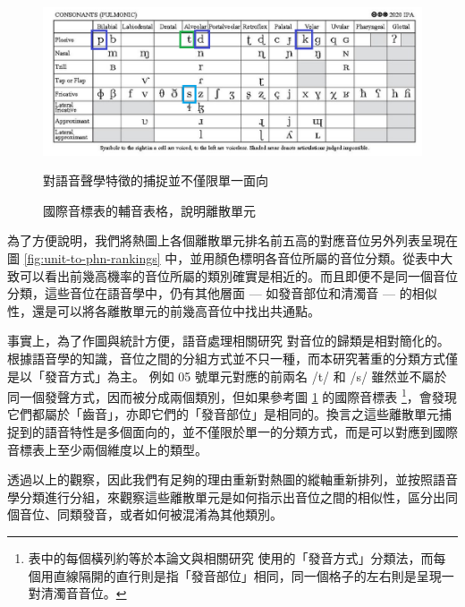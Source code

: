 \begin{figure}
    \centering
    \includegraphics[width=1\linewidth]{figures/ipa_similarity.png}
    \caption[]{
國際音標表的輔音表格，說明離散單元}
                                                                對語音聲學特徵的捕捉並不僅限單一面向
    \label{fig:ipa-cons-table-sim}
\end{figure}

        為了方便說明，我們將熱圖上各個離散單元排名前五高的對應音位另外列表呈現在圖 \ref{fig:unit-to-phn-rankings} 中，並用顏色標明各音位所屬的音位分類。從表中大致可以看出前幾高機率的音位所屬的類別確實是相近的。而且即便不是同一個音位分類，這些音位在語音學中，仍有其他層面 --- 如發音部位和清濁音 --- 的相似性，還是可以將各離散單元的前幾高音位中找出共通點。

        事實上，為了作圖與統計方便，語音處理相關研究 \cite{10097097, abdullah23_interspeech} 對音位的歸類是相對簡化的。根據語音學的知識，音位之間的分組方式並不只一種，而本研究著重的分類方式僅是以「發音方式」為主。
例如 05 號單元對應的前兩名 /t/ 和 /s/ 雖然並不屬於同一個發聲方式，因而被分成兩個類別，但如果參考圖 \ref{fig:ipa-cons-table-sim} 的國際音標表 \footnote{表中的每個橫列約等於本論文與相關研究\cite{10097097, abdullah23_interspeech} 使用的「發音方式」分類法，而每個用直線隔開的直行則是指「發音部位」相同，同一個格子的左右則是呈現一對清濁音音位。}，會發現它們都屬於「齒音」，亦即它們的「發音部位」是相同的。換言之這些離散單元捕捉到的語音特性是多個面向的，並不僅限於單一的分類方式，而是可以對應到國際音標表上至少兩個維度以上的類型。

        透過以上的觀察，因此我們有足夠的理由重新對熱圖的縱軸重新排列，並按照語音學分類進行分組，來觀察這些離散單元是如何指示出音位之間的相似性，區分出同個音位、同類發音，或者如何被混淆為其他類別。  


